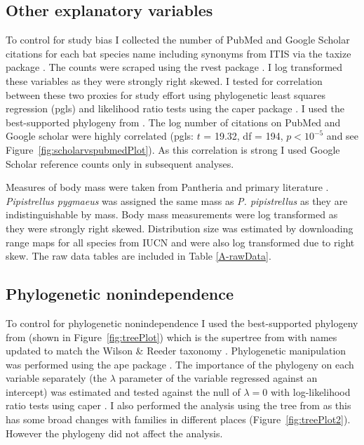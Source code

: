 \subsection{Other explanatory variables}

To control for study bias I collected the number of PubMed and Google Scholar citations for each bat species name including synonyms from ITIS \cite{itis} via the taxize package \cite{chamberlain2013taxize}.
The counts were scraped using the rvest package \cite{rvest}.
I log transformed these variables as they were strongly right skewed.
I tested for correlation between these two proxies for study effort using phylogenetic least squares regression (pgls) and likelihood ratio tests using the caper package \cite{caper}.
I used the best-supported phylogeny from \textcite{fritz2009geographical}.
The log number of citations on PubMed and Google scholar were highly correlated (pgls: $t$ = 19.32, df = 194, $p < 10^{-5}$ and see Figure~\ref{fig:scholarvspubmedPlot}).
As this correlation is strong I used Google Scholar reference counts only in subsequent analyses.

Measures of body mass were taken from Pantheria \cite{jones2009pantheria} and primary literature \cite{canals2005relative, arita1993rarity, lopez2014echolocation, orr2013does, lim2001bat, aldridge1987turning, ma2003dietary, owen2003home, henderson2008movements, heaney2012nyctalus, oleksy2015high, zhang2009recent}. 
\emph{Pipistrellus pygmaeus} was assigned the same mass as \emph{P. pipistrellus} as they are indistinguishable by mass.
Body mass measurements were log transformed as they were strongly right skewed.
Distribution size was estimated by downloading range maps for all species from IUCN \cite{iucn} and were also log transformed due to right skew.
The raw data tables are included in Table \ref{A-rawData}.




\subsection{Phylogenetic nonindependence}

To control for phylogenetic nonindependence I used the best-supported phylogeny from \textcite{fritz2009geographical} (shown in Figure~\ref{fig:treePlot}) which is the supertree from \cite{bininda2007delayed} with names updated to match the Wilson \& Reeder taxonomy \cite{wilson2005mammal}.
Phylogenetic manipulation was performed using the ape package \cite{ape}.
The importance of the phylogeny on each variable separately (the $\lambda$ parameter of the variable regressed against an intercept) was estimated and tested against the null of $\lambda = 0$ with log-likelihood ratio tests using caper \cite{caper}.
I also performed the analysis using the tree from \cite{jones2005bats} as this has some broad changes with families in different places (Figure~\ref{fig:treePlot2}).
However the phylogeny did not affect the analysis.




